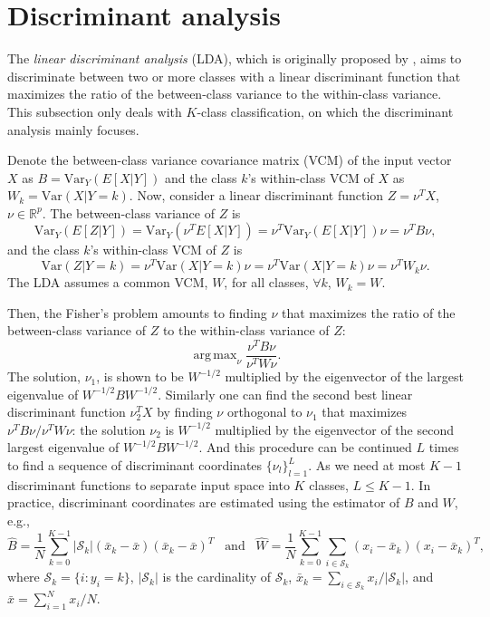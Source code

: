 \documentclass[12pt]{article}
\newcommand{\Var}{\mathrm{Var}}
\DeclareMathOperator*{\argmax}{arg\,max}
\begin{document}
\section{Discriminant analysis}

The {\it linear discriminant analysis} (LDA), which is originally proposed by \textcite{Fisher1936}, aims to discriminate between two or more classes with a linear discriminant function that maximizes the ratio of the between-class variance to the within-class variance. This subsection only deals with $K$-class classification, on which the discriminant analysis mainly focuses.

Denote the between-class variance covariance matrix (VCM) of the input vector $X$ as $B = \Var_Y(E[X|Y])$ and the class $k$'s within-class VCM of $X$ as $W_k = \Var(X|Y=k)$. Now, consider a linear discriminant function $Z = \nu^T X$, $\nu \in \mathbb{R}^p$. The between-class variance of $Z$ is 
\begin{equation*}
\Var_Y(E[Z|Y]) = \Var_Y(\nu^T E[X|Y]) = \nu^T \Var_Y(E[X|Y]) \nu = \nu^T B \nu,
\end{equation*}
and the class $k$'s within-class VCM of $Z$ is 
\begin{equation*}
\Var(Z|Y=k) = \nu^T \Var(X|Y=k) \nu = \nu^T \Var(X|Y=k) \nu = \nu^T W_k \nu.
\end{equation*}
The LDA assumes a common VCM, $W$, for all classes, $\forall k$, $W_k = W$.

Then, the Fisher's problem amounts to finding $\nu$ that maximizes the ratio of the between-class variance of $Z$ to the within-class variance of $Z$:
\begin{equation*}
\argmax_{\nu} \frac{\nu^T B \nu}{\nu^T W \nu}.
\end{equation*}
The solution, $\nu_1$, is shown to be $W^{-1/2}$ multiplied by the eigenvector of the largest eigenvalue of $W^{-1/2} B W^{-1/2}$. Similarly one can find the second best linear discriminant function $\nu_2^T X$ by finding $\nu$ orthogonal to $\nu_1$ that maximizes $\nu^T B \nu/\nu^T W \nu$: the solution $\nu_2$ is $W^{-1/2}$ multiplied by the eigenvector of the second largest eigenvalue of $W^{-1/2} B W^{-1/2}$. And this procedure can be continued $L$ times to find a sequence of discriminant coordinates $\{\nu_l\}_{l=1}^L$. As we need at most $K-1$ discriminant functions to separate input space into $K$ classes, $L \leq K-1$. In practice, discriminant coordinates are estimated using the estimator of $B$ and $W$, e.g.,
\begin{equation*}
\hat{B} = \frac{1}{N} \sum_{k=0}^{K-1} |\mathcal{S}_k| (\bar{x}_k - \bar{x}) (\bar{x}_k - \bar{x})^T \hspace{10pt} \text{and} \hspace{10pt} \hat{W} = \frac{1}{N} \sum_{k=0}^{K-1} \sum_{i \in \mathcal{S}_k} (x_i - \bar{x}_k) (x_i - \bar{x}_k)^T,
\end{equation*}
where $\mathcal{S}_k = \{i:y_i = k\}$, $|\mathcal{S}_k|$ is the cardinality of $\mathcal{S}_k$, $\bar{x}_k = \sum_{i \in \mathcal{S}_k} x_i/|\mathcal{S}_k|$, and $\bar{x} = \sum_{i=1}^N x_i/N$.
\end{document}
